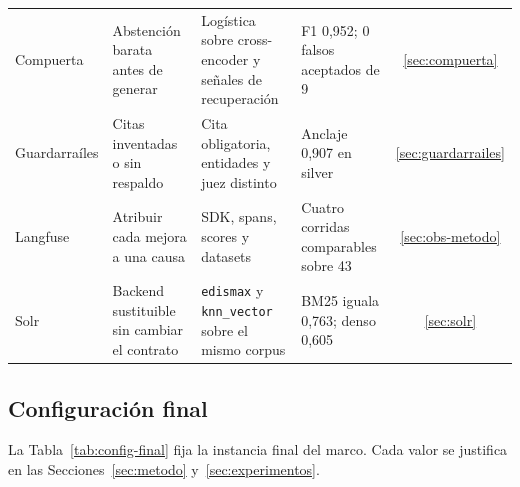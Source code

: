 \begin{table}[t]
\begin{tabular}{@{}p{2.3cm}p{3.9cm}p{4.8cm}p{4.4cm}c@{}}
Compuerta & Abstenci\'on barata antes de generar & Log\'istica sobre cross-encoder y se\~nales de recuperaci\'on & F1 0,952; 0 falsos aceptados de 9 & \ref{sec:compuerta} \\
Guardarra\'iles & Citas inventadas o sin respaldo & Cita obligatoria, entidades y juez distinto & Anclaje 0,907 en silver & \ref{sec:guardarrailes} \\
Langfuse & Atribuir cada mejora a una causa & SDK, spans, scores y datasets & Cuatro corridas comparables sobre 43 & \ref{sec:obs-metodo} \\
Solr & Backend sustituible sin cambiar el contrato & \texttt{edismax} y \texttt{knn\_vector} sobre el mismo corpus & BM25 iguala 0,763; denso 0,605 & \ref{sec:solr} \\
\bottomrule
\end{tabular}
\end{table}

\subsection{Configuraci\'on final}

La Tabla~\ref{tab:config-final} fija la instancia final del marco. Cada valor se justifica en las Secciones~\ref{sec:metodo} y~\ref{sec:experimentos}.

